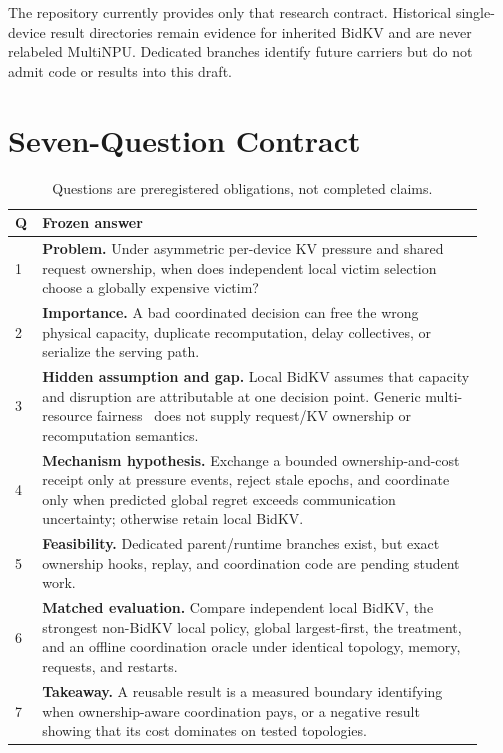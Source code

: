 \documentclass[10pt]{article}
\begin{document}
The repository currently provides only that research contract.  Historical
single-device result directories remain evidence for inherited BidKV and are
never relabeled MultiNPU.  Dedicated branches identify future carriers but do
not admit code or results into this draft.

\section{Seven-Question Contract}
\begin{table}[H]
\centering\small
\begin{tabular}{p{0.04\linewidth}p{0.89\linewidth}}
\toprule
Q & Frozen answer \\
\midrule
1 & \textbf{Problem.} Under asymmetric per-device KV pressure and shared request ownership, when does independent local victim selection choose a globally expensive victim? \\
2 & \textbf{Importance.} A bad coordinated decision can free the wrong physical capacity, duplicate recomputation, delay collectives, or serialize the serving path. \\
3 & \textbf{Hidden assumption and gap.} Local BidKV assumes that capacity and disruption are attributable at one decision point. Generic multi-resource fairness~\cite{Ghodsi2011} does not supply request/KV ownership or recomputation semantics. \\
4 & \textbf{Mechanism hypothesis.} Exchange a bounded ownership-and-cost receipt only at pressure events, reject stale epochs, and coordinate only when predicted global regret exceeds communication uncertainty; otherwise retain local BidKV. \\
5 & \textbf{Feasibility.} Dedicated parent/runtime branches exist, but exact ownership hooks, replay, and coordination code are pending student work. \\
6 & \textbf{Matched evaluation.} Compare independent local BidKV, the strongest non-BidKV local policy, global largest-first, the treatment, and an offline coordination oracle under identical topology, memory, requests, and restarts. \\
7 & \textbf{Takeaway.} A reusable result is a measured boundary identifying when ownership-aware coordination pays, or a negative result showing that its cost dominates on tested topologies. \\
\bottomrule
\end{tabular}
\caption{Questions are preregistered obligations, not completed claims.}
\end{table}
\end{document}
